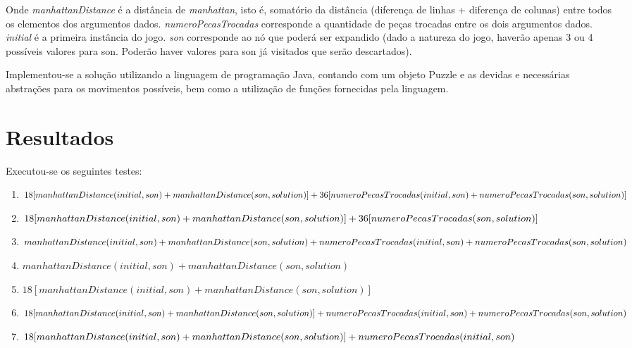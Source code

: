 \documentclass[12pt]{article}
\begin{document}
		Onde \textit{manhattanDistance} é a distância de \textit{manhattan}, isto é, somatório da distância (diferença de linhas + diferença de colunas) entre todos os elementos dos argumentos dados. \textit{numeroPecasTrocadas} corresponde a quantidade de peças trocadas entre os dois argumentos dados. \textit{initial} é a primeira instância do jogo. \textit{son} corresponde ao nó que poderá ser expandido (dado a natureza do jogo, haverão apenas 3 ou 4 possíveis valores para son. Poderão haver valores para son já visitados que serão descartados).

		Implementou-se a solução utilizando a linguagem de programação Java, contando com um objeto Puzzle e as devidas e necessárias abstrações para os movimentos possíveis, bem como a utilização de funções fornecidas pela linguagem.

	\section{Resultados}\label{sec:resultados}

		Executou-se os seguintes testes:

		\begin{enumerate}
			\item $18[manhattanDistance(initial, son) + manhattanDistance(son, solution)] +\\
			36[numeroPecasTrocadas(initial, son) + numeroPecasTrocadas(son, solution)]$
			\item $18[manhattanDistance(initial, son) + manhattanDistance(son, solution)] +\\
			36[numeroPecasTrocadas(son, solution)]$
			\item $manhattanDistance(initial, son) + manhattanDistance(son, solution) +\\
			numeroPecasTrocadas(initial, son) + numeroPecasTrocadas(son, solution)$
			\item $manhattanDistance(initial, son) + manhattanDistance(son, solution)$
			\item $18[manhattanDistance(initial, son) + manhattanDistance(son, solution)]$
			\item $18[manhattanDistance(initial, son) + manhattanDistance(son, solution)] +\\
			numeroPecasTrocadas(initial, son) + numeroPecasTrocadas(son, solution)$
			\item $18[manhattanDistance(initial, son) + manhattanDistance(son, solution)] +\\
			numeroPecasTrocadas(initial, son)$
		\end{enumerate}
\end{document}
